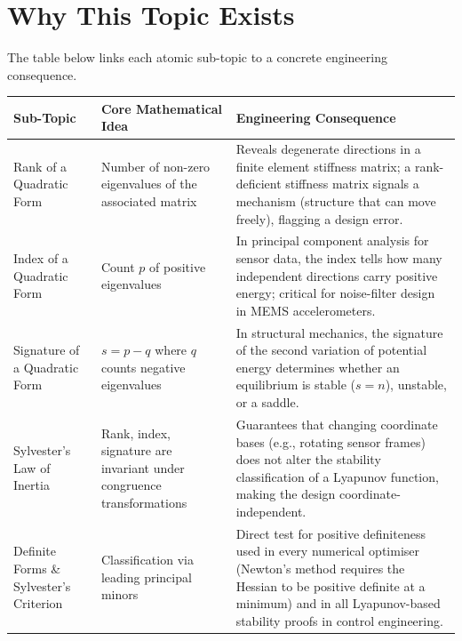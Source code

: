 \documentclass[12pt,a4paper]{article}
\begin{document}
\section{Why This Topic Exists}

The table below links each atomic sub-topic to a concrete engineering consequence.

\bigskip
\begin{tabular}{@{}p{3.2cm} p{5.2cm} p{6.2cm}@{}}
\toprule
\textbf{Sub-Topic} & \textbf{Core Mathematical Idea} & \textbf{Engineering Consequence} \\
\midrule
Rank of a Quadratic Form &
  Number of non-zero eigenvalues of the associated matrix &
  Reveals degenerate directions in a finite element stiffness matrix; a rank-deficient
  stiffness matrix signals a mechanism (structure that can move freely), flagging a
  design error. \\
\addlinespace
Index of a Quadratic Form &
  Count \(p\) of positive eigenvalues &
  In principal component analysis for sensor data, the index tells how many independent
  directions carry positive energy; critical for noise-filter design in MEMS accelerometers. \\
\addlinespace
Signature of a Quadratic Form &
  \(s = p - q\) where \(q\) counts negative eigenvalues &
  In structural mechanics, the signature of the second variation of potential energy
  determines whether an equilibrium is stable (\(s = n\)), unstable, or a saddle. \\
\addlinespace
Sylvester's Law of Inertia &
  Rank, index, signature are invariant under congruence transformations &
  Guarantees that changing coordinate bases (e.g., rotating sensor frames) does not
  alter the stability classification of a Lyapunov function, making the design
  coordinate-independent. \\
\addlinespace
Definite Forms \& Sylvester's Criterion &
  Classification via leading principal minors &
  Direct test for positive definiteness used in every numerical optimiser (Newton's method
  requires the Hessian to be positive definite at a minimum) and in all Lyapunov-based
  stability proofs in control engineering. \\
\bottomrule
\end{tabular}
\end{document}
